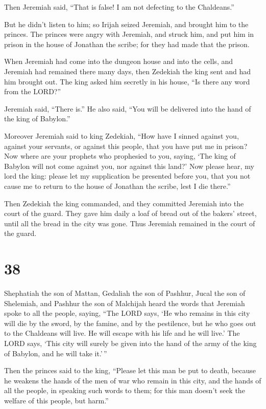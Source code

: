  Then Jeremiah said, ``That is false! I am not defecting
to the Chaldeans.''

But he didn't listen to him; so Irijah seized Jeremiah, and brought him
to the princes.  The princes were angry with Jeremiah,
and struck him, and put him in prison in the house of Jonathan the
scribe; for they had made that the prison.

 When Jeremiah had come into the dungeon house and into
the cells, and Jeremiah had remained there many days, 
then Zedekiah the king sent and had him brought out. The king asked him
secretly in his house, ``Is there any word from the LORD?''

Jeremiah said, ``There is.'' He also said, ``You will be delivered into
the hand of the king of Babylon.''

 Moreover Jeremiah said to king Zedekiah, ``How have I
sinned against you, against your servants, or against this people, that
you have put me in prison?  Now where are your prophets
who prophesied to you, saying, `The king of Babylon will not come
against you, nor against this land?'  Now please hear, my
lord the king: please let my supplication be presented before you, that
you not cause me to return to the house of Jonathan the scribe, lest I
die there.''

 Then Zedekiah the king commanded, and they committed
Jeremiah into the court of the guard. They gave him daily a loaf of
bread out of the bakers' street, until all the bread in the city was
gone. Thus Jeremiah remained in the court of the guard.

\hypertarget{section-37}{%
\section{38}\label{section-37}}

 Shephatiah the son of Mattan, Gedaliah the son of
Pashhur, Jucal the son of Shelemiah, and Pashhur the son of Malchijah
heard the words that Jeremiah spoke to all the people, saying,
 ``The LORD says, `He who remains in this city will die by
the sword, by the famine, and by the pestilence, but he who goes out to
the Chaldeans will live. He will escape with his life and he will live.'
 The LORD says, `This city will surely be given into the
hand of the army of the king of Babylon, and he will take it.'\,''

 Then the princes said to the king, ``Please let this man
be put to death, because he weakens the hands of the men of war who
remain in this city, and the hands of all the people, in speaking such
words to them; for this man doesn't seek the welfare of this people, but
harm.''

